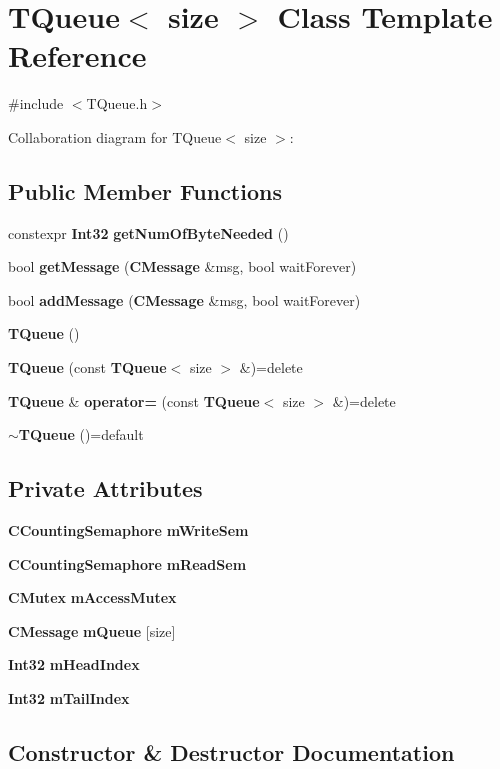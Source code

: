 \section{T\-Queue$<$ size $>$ Class Template Reference}
\label{classTQueue}


{\ttfamily \#include $<$T\-Queue.\-h$>$}



Collaboration diagram for T\-Queue$<$ size $>$\-:
\subsection*{Public Member Functions}
\begin{DoxyCompactItemize}
\item 
constexpr {\bf Int32} {\bf get\-Num\-Of\-Byte\-Needed} ()
\item 
bool {\bf get\-Message} ({\bf C\-Message} \&msg, bool wait\-Forever)
\item 
bool {\bf add\-Message} ({\bf C\-Message} \&msg, bool wait\-Forever)
\item 
{\bf T\-Queue} ()
\item 
{\bf T\-Queue} (const {\bf T\-Queue}$<$ size $>$ \&)=delete
\item 
{\bf T\-Queue} \& {\bf operator=} (const {\bf T\-Queue}$<$ size $>$ \&)=delete
\item 
{\bf $\sim$\-T\-Queue} ()=default
\end{DoxyCompactItemize}
\subsection*{Private Attributes}
\begin{DoxyCompactItemize}
\item 
{\bf C\-Counting\-Semaphore} {\bf m\-Write\-Sem}
\item 
{\bf C\-Counting\-Semaphore} {\bf m\-Read\-Sem}
\item 
{\bf C\-Mutex} {\bf m\-Access\-Mutex}
\item 
{\bf C\-Message} {\bf m\-Queue} [size]
\item 
{\bf Int32} {\bf m\-Head\-Index}
\item 
{\bf Int32} {\bf m\-Tail\-Index}
\end{DoxyCompactItemize}


\subsection{Constructor \& Destructor Documentation}

